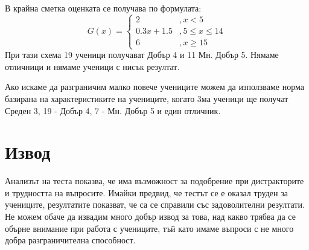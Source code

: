 В крайна сметка оценката се получава по формулата:
\begin{equation}
    G(x) = \begin{cases}
        2          & , x < 5            \\
        0.3x + 1.5 & , 5 \leq x \leq 14 \\
        6          & , x \geq 15
    \end{cases}
\end{equation}
При тази схема 19 ученици получават Добър 4 и 11 Мн. Добър 5. Нямаме отличници и нямаме ученици с нисък резултат.

Ако искаме да разграничим малко повече учениците можем да използваме норма базирана на характеристиките на учениците, когато 3ма ученици ще получат Среден 3, 19 - Добър 4, 7 - Мн. Добър 5 и един отличник.

\section{Извод}
Анализът на теста показва, че има възможност за подобрение при дистракторите и трудността на въпросите. Имайки предвид, че тестът се е оказал труден за учениците, резултатите показват, че са се справили със задоволителни резултати. Не можем обаче да извадим много добър извод за това, над какво трябва да се обърне внимание при работа с учениците, тъй като имаме въпроси с не много добра разграничителна способност.